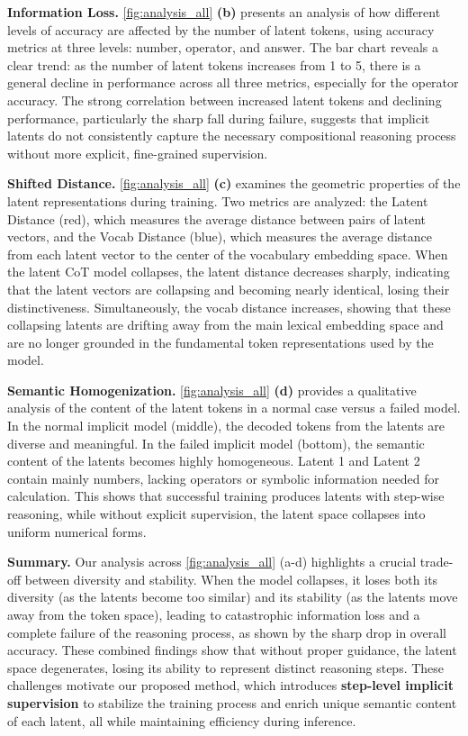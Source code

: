 \noindent \textbf{Information Loss.}
\cref{fig:analysis_all} \textbf{(b)} presents an analysis of how different levels of accuracy are affected by the number of latent tokens, using accuracy metrics at three levels: number, operator, and answer.
The bar chart reveals a clear trend: as the number of latent tokens increases from 1 to 5, there is a general decline in performance across all three metrics, especially for the operator accuracy.
The strong correlation between increased latent tokens and declining performance, particularly the sharp fall during failure, suggests that implicit latents do not consistently capture the necessary compositional reasoning process without more explicit, fine-grained supervision.

\noindent \textbf{Shifted Distance.}
\cref{fig:analysis_all} \textbf{(c)} examines the geometric properties of the latent representations during training.
Two metrics are analyzed: the Latent Distance (red), which measures the average distance between pairs of latent vectors, and the Vocab Distance (blue), which measures the average distance from each latent vector to the center of the vocabulary embedding space.
When the latent CoT model collapses, the latent distance decreases sharply, indicating that the latent vectors are collapsing and becoming nearly identical, losing their distinctiveness.
Simultaneously, the vocab distance increases, showing that these collapsing latents are drifting away from the main lexical embedding space and are no longer grounded in the fundamental token representations used by the model.

\noindent \textbf{Semantic Homogenization.}  
\cref{fig:analysis_all} \textbf{(d)} provides a qualitative analysis of the content of the latent tokens in a normal case versus a failed model.
In the normal implicit model (middle), the decoded tokens from the latents are diverse and meaningful.
In the failed implicit model (bottom), the semantic content of the latents becomes highly homogeneous.
Latent 1 and Latent 2 contain mainly numbers, lacking operators or symbolic information needed for calculation. This shows that successful training produces latents with step-wise reasoning, while without explicit supervision, the latent space collapses into uniform numerical forms.

\noindent \textbf{Summary.}
Our analysis across \cref{fig:analysis_all} (a-d) highlights a crucial trade-off between diversity and stability.
When the model collapses, it loses both its diversity (as the latents become too similar) and its stability (as the latents move away from the token space), leading to catastrophic information loss and a complete failure of the reasoning process, as shown by the sharp drop in overall accuracy.
These combined findings show that without proper guidance, the latent space degenerates, losing its ability to represent distinct reasoning steps.
These challenges motivate our proposed method, which introduces \textbf{step-level implicit supervision} to stabilize the training process and enrich unique semantic content of each latent, all while maintaining efficiency during inference.

